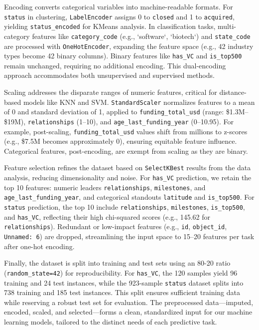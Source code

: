 \documentclass[conference]{IEEEtran}
\begin{document}
    Encoding converts categorical variables into machine-readable formats. For \texttt{status} in clustering, \texttt{LabelEncoder} assigns 0 to \texttt{closed} and 1 to \texttt{acquired}, yielding \texttt{status\_encoded} for KMeans analysis. In classification tasks, multi-category features like \texttt{category\_code} (e.g., `software`, `biotech`) and \texttt{state\_code} are processed with \texttt{OneHotEncoder}, expanding the feature space (e.g., 42 industry types become 42 binary columns). Binary features like \texttt{has\_VC} and \texttt{is\_top500} remain unchanged, requiring no additional encoding. This dual-encoding approach accommodates both unsupervised and supervised methods.

    Scaling addresses the disparate ranges of numeric features, critical for distance-based models like KNN and SVM. \texttt{StandardScaler} normalizes features to a mean of 0 and standard deviation of 1, applied to \texttt{funding\_total\_usd} (range: \$1.3M–\$19M), \texttt{relationships} (1–10), and \texttt{age\_last\_funding\_year} (0–10.95). For example, post-scaling, \texttt{funding\_total\_usd} values shift from millions to z-scores (e.g., \$7.5M becomes approximately 0), ensuring equitable feature influence. Categorical features, post-encoding, are exempt from scaling as they are binary.

    Feature selection refines the dataset based on \texttt{SelectKBest} results from the data analysis, reducing dimensionality and noise. For \texttt{has\_VC} prediction, we retain the top 10 features: numeric leaders \texttt{relationships}, \texttt{milestones}, and \texttt{age\_last\_funding\_year}, and categorical standouts \texttt{latitude} and \texttt{is\_top500}. For \texttt{status} prediction, the top 10 include \texttt{relationships}, \texttt{milestones}, \texttt{is\_top500}, and \texttt{has\_VC}, reflecting their high chi-squared scores (e.g., 145.62 for \texttt{relationships}). Redundant or low-impact features (e.g., \texttt{id}, \texttt{object\_id}, \texttt{Unnamed: 6}) are dropped, streamlining the input space to 15–20 features per task after one-hot encoding.

    Finally, the dataset is split into training and test sets using an 80-20 ratio (\texttt{random\_state=42}) for reproducibility. For \texttt{has\_VC}, the 120 samples yield 96 training and 24 test instances, while the 923-sample \texttt{status} dataset splits into 738 training and 185 test instances. This split ensures sufficient training data while reserving a robust test set for evaluation. The preprocessed data—imputed, encoded, scaled, and selected—forms a clean, standardized input for our machine learning models, tailored to the distinct needs of each predictive task.
\end{document}
